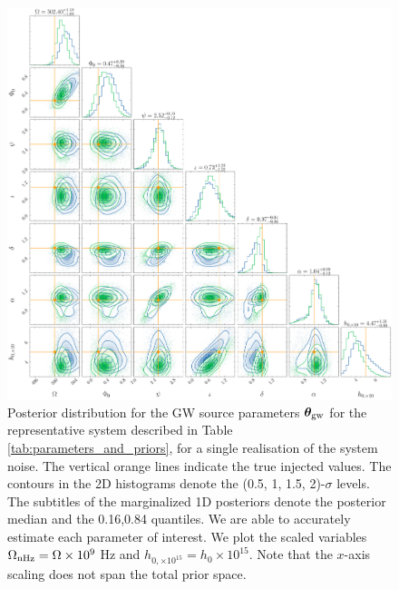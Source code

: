\documentclass[fleqn,usenatbib,useAMS]{mnras}
\begin{document}
\begin{figure}
	\includegraphics[width=\textwidth, height =\textwidth ]{images/corner_lowSNR}
	\caption{Posterior distribution for the GW source parameters $\boldsymbol{\theta}_{\rm gw}$ for the representative system described in Table \ref{tab:parameters_and_priors}, for a single realisation of the system noise. The vertical orange lines indicate the true injected values. The contours in the 2D histograms denote the (0.5, 1, 1.5, 2)-$\sigma$ levels. The subtitles of the marginalized 1D posteriors denote the posterior median and the 0.16,0.84 quantiles. We are able to accurately estimate each parameter of interest. We plot the scaled variables $\Omega_{\rm nHz} = \Omega \times 10^{9}$ Hz and $h_{0, \times 10^{15}} = h_0 \times 10^{15}$. Note that the $x$-axis scaling does not span the total prior space.}
	\label{fig:corner_plot_compare_low}
\end{figure}
\end{document}
